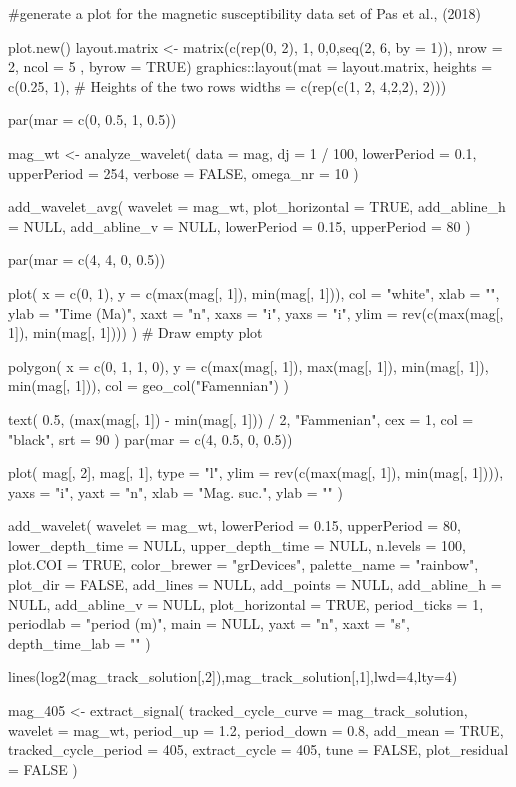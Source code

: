 \documentclass[a4paper]{book}
\begin{document}
\begin{Examples}
\begin{ExampleCode}

#generate a plot for the magnetic susceptibility data set of Pas et al., (2018)

plot.new()
layout.matrix <- matrix(c(rep(0, 2), 1, 0,0,seq(2, 6, by = 1)),
                       nrow = 2,
                      ncol = 5 ,
                       byrow = TRUE)
graphics::layout(mat = layout.matrix,
                heights = c(0.25, 1),
                # Heights of the two rows
                widths = c(rep(c(1, 2, 4,2,2), 2)))

par(mar = c(0, 0.5, 1, 0.5))


mag_wt <-
 analyze_wavelet(
   data = mag,
   dj = 1 / 100,
  lowerPeriod = 0.1,
   upperPeriod = 254,
   verbose = FALSE,
   omega_nr = 10
 )

 add_wavelet_avg(
 wavelet = mag_wt,
 plot_horizontal = TRUE,
 add_abline_h = NULL,
 add_abline_v = NULL,
 lowerPeriod = 0.15,
 upperPeriod = 80
)

par(mar = c(4, 4, 0, 0.5))


plot(
 x = c(0, 1),
 y = c(max(mag[, 1]), min(mag[, 1])),
 col = "white",
 xlab = "",
 ylab = "Time (Ma)",
 xaxt = "n",
 xaxs = "i",
 yaxs = "i",
 ylim = rev(c(max(mag[, 1]), min(mag[, 1])))
)            # Draw empty plot


polygon(
 x = c(0, 1, 1, 0),
 y = c(max(mag[, 1]), max(mag[, 1]), min(mag[, 1]), min(mag[, 1])),
 col = geo_col("Famennian")
)

text(
 0.5,
 (max(mag[, 1]) - min(mag[, 1])) / 2,
 "Fammenian",
 cex = 1,
 col = "black",
 srt = 90
)
par(mar = c(4, 0.5, 0, 0.5))


plot(
 mag[, 2],
 mag[, 1],
 type = "l",
 ylim = rev(c(max(mag[, 1]), min(mag[, 1]))),
 yaxs = "i",
 yaxt = "n",
 xlab = "Mag. suc.",
 ylab = ""
)


add_wavelet(
 wavelet = mag_wt,
 lowerPeriod = 0.15,
 upperPeriod = 80,
 lower_depth_time = NULL,
 upper_depth_time = NULL,
 n.levels = 100,
 plot.COI = TRUE,
 color_brewer = "grDevices",
 palette_name = "rainbow",
 plot_dir = FALSE,
 add_lines = NULL,
 add_points = NULL,
 add_abline_h = NULL,
 add_abline_v = NULL,
 plot_horizontal = TRUE,
 period_ticks = 1,
 periodlab = "period (m)",
 main = NULL,
 yaxt = "n",
 xaxt = "s",
 depth_time_lab = ""
)


lines(log2(mag_track_solution[,2]),mag_track_solution[,1],lwd=4,lty=4)

mag_405 <- extract_signal(
 tracked_cycle_curve = mag_track_solution,
 wavelet = mag_wt,
 period_up = 1.2,
 period_down = 0.8,
 add_mean = TRUE,
 tracked_cycle_period = 405,
 extract_cycle = 405,
 tune = FALSE,
 plot_residual = FALSE
)


\end{ExampleCode}
\end{Examples}
\end{document}
